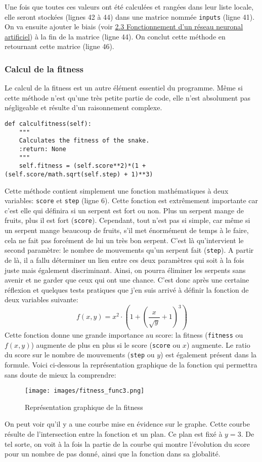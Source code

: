 \documentclass[12pt, a4paper, openany]{book}
\begin{document}
Une fois que toutes ces valeurs ont été calculées et rangées dans leur liste locale, elle seront stockées (lignes 42 à 44) dans une matrice nommée \verb'inputs' (ligne 41). On va ensuite ajouter le biais (voir \hyperref[r:2.3]{2.3 Fonctionnement d'un réseau neuronal artificiel}) à la fin de la matrice (ligne 44). On conclut cette méthode en retournant cette matrice (ligne 46).

\subsubsection{Calcul de la fitness}
\label{r:2.7.3-fit}
Le calcul de la fitness est un autre élément essentiel du programme. Même si cette méthode n'est qu'une très petite partie de code, elle n'est absolument pas négligeable et résulte d'un raisonnement complexe.
\begin{verbatim}
def calculfitness(self):
    """
    Calculates the fitness of the snake.
    :return: None
    """
    self.fitness = (self.score**2)*(1 + (self.score/math.sqrt(self.step) + 1)**3)
\end{verbatim}
Cette méthode contient simplement une fonction mathématiques à deux variables: \verb'score' et \verb'step' (ligne 6). Cette fonction est extrêmement importante car c'est elle qui définira si un serpent est fort ou non. Plus un serpent \og{}mange\fg{} de fruits, plus il est fort (\verb'score'). Cependant, tout n'est pas si simple, car même si un serpent \og{}mange\fg{} beaucoup de fruits, s'il met énormément de temps à le faire, cela ne fait pas forcément de lui un très bon serpent. C'est là qu’intervient le second paramètre: le nombre de mouvements qu'un serpent fait (\verb'step'). A partir de là, il a fallu déterminer un lien entre ces deux paramètres qui soit à la fois juste mais également discriminant. Ainsi, on pourra éliminer les serpents sans \og{}avenir\fg{} et ne garder que ceux qui ont une chance.\newline
C'est donc après une certaine réflexion et quelques tests pratiques que j'en suis arrivé à définir la fonction de deux variables suivante:
$$
f(x, y) = x^2 \cdot{} \left(1 + \left (\frac{x}{\sqrt{y}}+1\right)^3\right)
$$
Cette fonction donne une grande importance au score: la fitness (\verb'fitness' ou $f(x,y)$) augmente de plus en plus si le score (\verb'score' ou $x$) augmente. Le ratio du score sur le nombre de mouvements (\verb'step' ou $y$) est également présent dans la formule.\newline
Voici ci-dessous la représentation graphique de la fonction qui permettra sans doute de mieux la comprendre:
\begin{figure}[H]
    \centering
    \texttt{[image: images/fitness\_func3.png]}
    \caption{Représentation graphique de la fitness}
\end{figure}
On peut voir qu'il y a une courbe mise en évidence sur le graphe. Cette courbe résulte de l’intersection entre la fonction et un plan. Ce plan est fixé à $y=3$. De tel sorte, on voit à la fois la partie de la courbe qui montre l'évolution du score pour un nombre de pas donné, ainsi que la fonction dans sa globalité.
\end{document}
